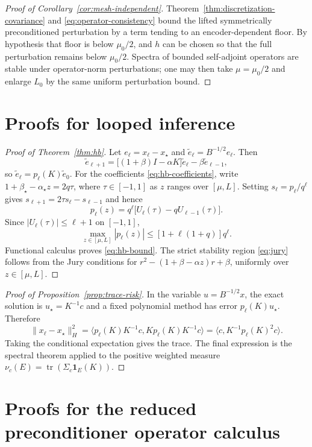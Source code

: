 \documentclass[11pt,a4paper]{article}
\numberwithin{equation}{section}
\theoremstyle{definition}
\theoremstyle{remark}
\newcommand{\tr}{\operatorname{tr}}
\newcommand{\wt}{\widetilde}
\begin{document}
\begin{proof}[Proof of Corollary~\ref{cor:mesh-independent}]
Theorem~\ref{thm:discretization-covariance} and
\eqref{eq:operator-consistency} bound the lifted symmetrically preconditioned
perturbation by a term tending to an encoder-dependent floor.  By hypothesis
that floor is below $\mu_0/2$, and $h$ can be chosen so that the full
perturbation remains below $\mu_0/2$.  Spectra of bounded self-adjoint
operators are stable under operator-norm perturbations; one may then take
$\mu=\mu_0/2$ and enlarge $L_0$ by the same uniform perturbation bound.
\end{proof}

\section{Proofs for looped inference}

\begin{proof}[Proof of Theorem~\ref{thm:hb}]
Let $e_\ell=x_\ell-x_\star$ and
$\wt e_\ell=B^{-1/2}e_\ell$.  Then
\[
 \wt e_{\ell+1}=\bigl[(1+\beta)I-\alpha K\bigr]\wt e_\ell
 -\beta\wt e_{\ell-1},
\]
so $\wt e_\ell=p_\ell(K)\wt e_0$.  For the coefficients
\eqref{eq:hb-coefficients}, write
$1+\beta_\star-\alpha_\star z=2q\tau$, where $\tau\in[-1,1]$ as
$z$ ranges over $[\mu,L]$.  Setting $s_\ell=p_\ell/q^\ell$ gives
$s_{\ell+1}=2\tau s_\ell-s_{\ell-1}$ and hence
\[
 p_\ell(z)=q^\ell\bigl[U_\ell(\tau)-qU_{\ell-1}(\tau)\bigr].
\]
Since $|U_\ell(\tau)|\le\ell+1$ on $[-1,1]$,
\[
 \max_{z\in[\mu,L]}|p_\ell(z)|
 \le[1+\ell(1+q)]q^\ell.
\]
Functional calculus proves \eqref{eq:hb-bound}.  The strict stability region
\eqref{eq:jury} follows from the Jury conditions for
$r^2-(1+\beta-\alpha z)r+\beta$, uniformly over $z\in[\mu,L]$.
\end{proof}

\begin{proof}[Proof of Proposition~\ref{prop:trace-risk}]
In the variable $u=B^{-1/2}x$, the exact solution is $u_\star=K^{-1}c$ and a
fixed polynomial method has error $p_\ell(K)u_\star$.  Therefore
\[
 \|x_\ell-x_\star\|_H^2
 =\langle p_\ell(K)K^{-1}c,
 Kp_\ell(K)K^{-1}c\rangle
 =\langle c,K^{-1}p_\ell(K)^2c\rangle.
\]
Taking the conditional expectation gives the trace.  The final expression is
the spectral theorem applied to the positive weighted measure
$\nu_c(E)=\tr(\Sigma_c\mathbf 1_E(K))$.
\end{proof}

\section{Proofs for the reduced preconditioner operator calculus}
\end{document}

